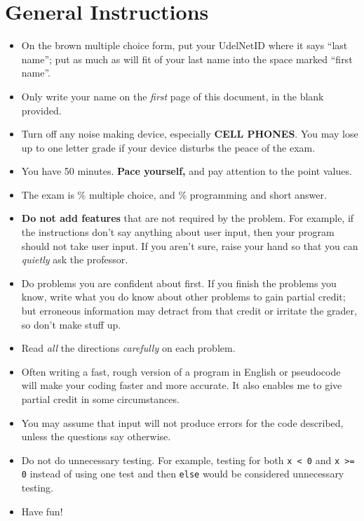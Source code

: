 \documentclass[master]{exam}
\newcommand{\examversion}{Master}
\begin{document}
\examheader{CISC 106}{CISC 106 Fall 2009}{\examversion}


\vspace{14pt}


\section*{General Instructions} 

\begin{itemize}
\item On the brown multiple choice form, put your UdelNetID 
  where it says ``last name''; put as much as will fit of your last
  name into the space marked ``first name''.
\item Only write your name on the \emph{first} page of this document, in the
  blank provided.
\item Turn off any noise making device, especially \textbf{CELL
  PHONES}. You may lose up to one letter grade if your device disturbs
  the peace of the exam.

\item You have 50 minutes. {\bf Pace yourself,}
and pay attention to the point values.  

\item The exam is \% multiple choice, and \% programming and short
answer.
 
\item \textbf{Do not add features} that are not required by the problem. For
example, if the instructions don't say anything about user input, then
your program should not take user input. If you aren't sure, raise
your hand so that you can \emph{quietly} ask the professor.

\item Do problems you are confident about first. If you finish the
problems you know, write what you do know about other problems to gain
partial credit; but erroneous information may detract from that
credit or irritate the grader, so don't make stuff up. 

\item Read {\em all} the directions {\em carefully} on each problem.

\item Often writing a fast, rough version of a program in English or
pseudocode will make your coding faster and more accurate. It also
enables me to give partial credit in some circumstances.

\item You may assume that input will not produce errors for the
code described, unless the questions say otherwise. 
 
\item Do not do unnecessary testing. For example, testing for both
\verb+x < 0+ and \verb+x >= 0+ instead of using one test and then
\verb+else+ would be considered unnecessary
testing.

\item Have fun!

\end{itemize}
\end{document}
